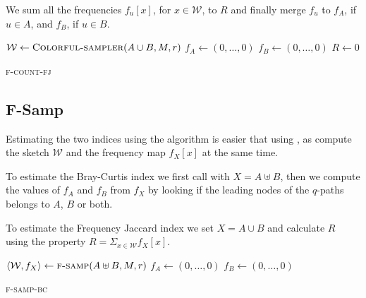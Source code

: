 We sum all the frequencies $f_u[x]$, for $x \in \mathcal{W}$, to $R$ and finally merge $f_{u}$ to $f_A$, if $u \in A$, and $f_B$, if $u \in B$.

\begin{algorithm}[h]
	\small
	\DontPrintSemicolon
	\BlankLine
	$\mathcal{W} \gets \textsc{Colorful-sampler}(A \cup B, M, r)$ \;
	$f_A \gets (0,\ldots,0)$\;
	$f_B \gets (0,\ldots,0)$\;
	$R \gets 0$\;
	\BlankLine
	\BlankLine
	\caption{\textsc{f-count-fj}}
	\label{alg:f-count-fj}
\end{algorithm}

\subsection*{F-Samp}

Estimating the two indices using the \fsamp algorithm is easier that using \fcount, as \fsamp compute the sketch $\mathcal{W}$ and the frequency map $f_X[x]$ at the same time.\medskip

To estimate the Bray-Curtis index we first call \fsamp with $X = A \uplus B$, then we compute the values of $f_A$ and $f_B$ from $f_X$ by looking if the leading nodes of the $q$-paths belongs to $A$, $B$ or both.

To estimate the Frequency Jaccard index we set $X = A \cup B$ and calculate $R$ using the property $R = \Sigma_{x \in \mathcal{W}}{f_X[x]}$.

\clearpage

\begin{algorithm}[h]
	\small
	\DontPrintSemicolon
	$\langle \mathcal{W}, f_X \rangle \gets \textsc{f-samp}(A \uplus B, M, r)$ \;
	$f_A \gets (0,\ldots,0)$\;
	$f_B \gets (0,\ldots,0)$\;
	\caption{\textsc{f-samp-bc}}
	\label{alg:f-samp-bc}
\end{algorithm}

